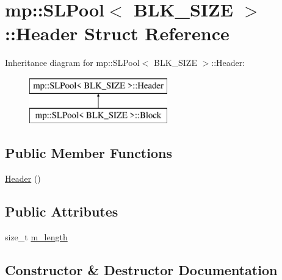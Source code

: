 \hypertarget{structmp_1_1_s_l_pool_1_1_header}{}\section{mp\+:\+:S\+L\+Pool$<$ B\+L\+K\+\_\+\+S\+I\+ZE $>$\+:\+:Header Struct Reference}
\label{structmp_1_1_s_l_pool_1_1_header}
Inheritance diagram for mp\+:\+:S\+L\+Pool$<$ B\+L\+K\+\_\+\+S\+I\+ZE $>$\+:\+:Header\+:\begin{figure}[H]
\begin{center}
\leavevmode
\includegraphics[height=2.000000cm]{structmp_1_1_s_l_pool_1_1_header}
\end{center}
\end{figure}
\subsection*{Public Member Functions}
\begin{DoxyCompactItemize}
\item 
\hyperlink{structmp_1_1_s_l_pool_1_1_header_a8dde5a9b243239f67fa13cbc63fce081}{Header} ()
\end{DoxyCompactItemize}
\subsection*{Public Attributes}
\begin{DoxyCompactItemize}
\item 
size\+\_\+t \hyperlink{structmp_1_1_s_l_pool_1_1_header_a4ce73cd63134fdeb85adab3c35b744c0}{m\+\_\+length}
\end{DoxyCompactItemize}


\subsection{Constructor \& Destructor Documentation}
\mbox{\label{structmp_1_1_s_l_pool_1_1_header_a8dde5a9b243239f67fa13cbc63fce081}} 
